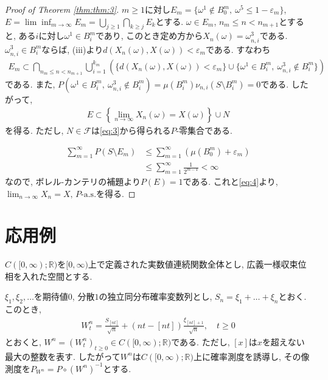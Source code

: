 \begin{proof}[Proof of Theorem \ref{thm:thm:3}]
    $m\geq 1$に対し$E_m=\{\omega^1\notin B^m_0,~\omega^5\leq 1-\varepsilon_m\}$, $E=\lim\inf_{m\to\infty}E_m=\bigcup_{j\geq 1}\bigcap_{k\geq j}E_k$とする.
    $\omega\in E_m$, $n_m\leq n<n_{m+1}$とすると, ある$i$に対し$\omega^1\in B^m_i$であり, このとき定め方から$X_n(\omega)=\omega^3_{n,i}$である.
    $\omega^3_{n,i}\in B^m_i$ならば, (iii)より$d(X_n(\omega),X(\omega))<\varepsilon_m$である.
    すなわち
    \begin{align}
        E_m \subset \bigcap_{n_m\leq n<n_{m+1}}\bigcup_{i=1}^{k_m} \left( \{d(X_n(\omega),X(\omega))<\varepsilon_m\} \cup \{\omega^1\in B^m_i,~\omega^3_{n,i}\notin B^m_i\} \right) \label{eq:3}
    \end{align}
    である.
    また, $P(\omega^1\in B^m_i,~\omega^3_{n,i}\notin B^m_i)=\mu(B^m_i)\nu_{n,i}(S\setminus B^m_i)=0$である.
    したがって,
    \begin{align}
        E \subset \left\{\lim_{n\to\infty}X_n(\omega)=X(\omega)\right\} \cup N \label{eq:4}
    \end{align}
    を得る. ただし, $N\in\mathcal{F}$は\eqref{eq:3}から得られる$P$-零集合である.

    \begin{align*}
        \sum_{m=1}^\infty P(S\setminus E_m)
         & \leq \sum_{m=1}^\infty (\mu(B^m_0)+\varepsilon_m) \\[.5em]
         & \leq \sum_{m=1}^\infty \frac{1}{2^{m-1}} < \infty
    \end{align*}
    なので, ボレル-カンテリの補題より$P(E)=1$である.
    これと\eqref{eq:4}より, $\lim_{n\to\infty}X_n=X,\,\text{$P$-a.s.}$を得る.
\end{proof}

\section{応用例}
$C([0,\infty);\mathbb{R})$を$[0,\infty)$上で定義された実数値連続関数全体とし, 広義一様収束位相を入れた空間とする.

$\xi_1,\xi_2,\dots$を期待値$0$, 分散$1$の独立同分布確率変数列とし, $S_n=\xi_1+\dots+\xi_n$とおく.
このとき,
\begin{align*}
    W^n_t = \frac{S_{[nt]}}{\sqrt{n}} + (nt-[nt])\frac{\xi_{[nt]+1}}{\sqrt{n}}, \quad t\geq 0
\end{align*}
とおくと, $W^n=(W^n_t)_{t\geq 0}\in C([0,\infty);\mathbb{R})$である.
ただし, $[x]$は$x$を超えない最大の整数を表す.
したがって$W^n$は$C([0,\infty);\mathbb{R})$上に確率測度を誘導し, その像測度を$P_{W^n}=P\circ(W^n)^{-1}$とする.

